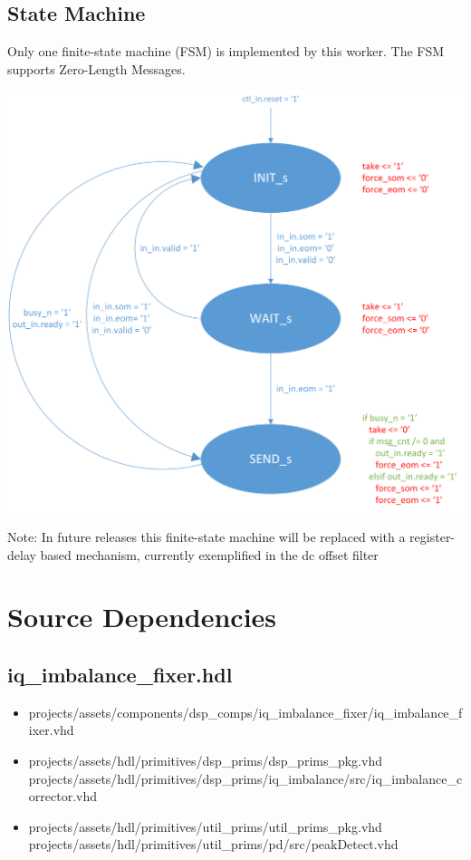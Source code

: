 \documentclass{article}
\def\comp{iq\_imbalance\_fixer}
\begin{document}
	\subsection*{State Machine}
	\begin{flushleft}
		Only one finite-state machine (FSM) is implemented by this worker. The FSM supports Zero-Length Messages.
	\end{flushleft}
	{\centering\captionsetup{type=figure}\includegraphics[scale=0.6]{zlm_fsm}\par{}\label{fig:zlm_fsm}}
        \begin{flushleft}
                Note: In future releases this finite-state machine will be replaced with a register-delay based mechanism, currently exemplified in the dc offset filter
        \end{flushleft}

	\newpage

	\section*{Source Dependencies}
	\subsection*{\comp.hdl}
	\begin{itemize}
		\item projects/assets/components/dsp\_comps/iq\_imbalance\_fixer/iq\_imbalance\_fixer.vhd
		\item projects/assets/hdl/primitives/dsp\_prims/dsp\_prims\_pkg.vhd
		      \subitem projects/assets/hdl/primitives/dsp\_prims/iq\_imbalance/src/iq\_imbalance\_corrector.vhd
		\item projects/assets/hdl/primitives/util\_prims/util\_prims\_pkg.vhd
		      \subitem projects/assets/hdl/primitives/util\_prims/pd/src/peakDetect.vhd
	\end{itemize}
\end{document}
